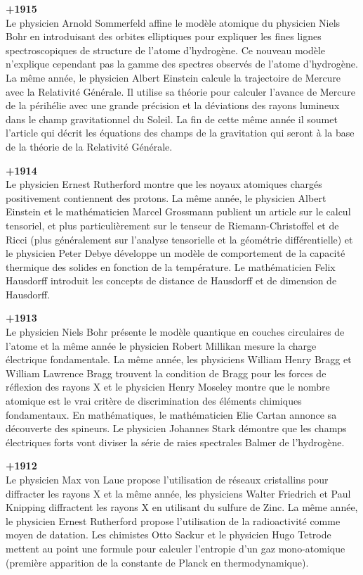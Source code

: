 \textbf{+1915}\\
Le physicien Arnold Sommerfeld affine le modèle atomique du physicien Niels Bohr en introduisant des orbites elliptiques pour expliquer les fines lignes spectroscopiques de structure de l'atome d'hydrogène. Ce nouveau modèle n'explique cependant pas la gamme des spectres observés de l'atome d'hydrogène. La même année, le physicien Albert Einstein calcule la trajectoire de Mercure avec la Relativité Générale. Il utilise sa théorie pour calculer l'avance de Mercure de la périhélie avec une grande précision et la déviations des rayons lumineux dans le champ gravitationnel du Soleil. La fin de cette même année il soumet l'article qui décrit les équations des champs de la gravitation qui seront à la base de la théorie de la Relativité Générale.

\textbf{+1914}\\
Le physicien Ernest Rutherford montre que les noyaux atomiques chargés positivement contiennent des protons. La même année, le physicien Albert Einstein et le mathématicien Marcel Grossmann publient un article sur le calcul tensoriel, et plus particulièrement sur le tenseur de Riemann-Christoffel et de Ricci (plus généralement sur l'analyse tensorielle et la géométrie différentielle) et le physicien Peter Debye développe un modèle de comportement de la capacité thermique des solides en fonction de la température. Le mathématicien Felix Hausdorff introduit les concepts de distance de Hausdorff et de dimension de Hausdorff.

\textbf{+1913}\\
Le physicien Niels Bohr présente le modèle quantique en couches circulaires de l'atome et la même année le physicien Robert Millikan mesure la charge électrique fondamentale. La même année, les physiciens William Henry Bragg et William Lawrence Bragg trouvent la condition de Bragg pour les forces de réflexion des rayons X et le physicien Henry Moseley montre que le nombre atomique est le vrai critère de discrimination des éléments chimiques fondamentaux. En mathématiques, le mathématicien Elie Cartan annonce sa découverte des spineurs. Le physicien Johannes Stark démontre que les champs électriques forts vont diviser la série de raies spectrales Balmer de l'hydrogène.

\textbf{+1912}\\
Le physicien Max von Laue propose l'utilisation de réseaux cristallins pour diffracter les rayons X et la même année, les physiciens Walter Friedrich et Paul Knipping diffractent les rayons X en utilisant du sulfure de Zinc. La même année, le physicien Ernest Rutherford propose l'utilisation de la radioactivité comme moyen de datation. Les chimistes Otto Sackur et le physicien Hugo Tetrode mettent au point une formule pour calculer l'entropie d'un gaz mono-atomique (première apparition de la constante de Planck en thermodynamique).

